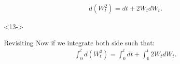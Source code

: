 \documentclass[10pt]{beamer}
\begin{document}
\begin{frame}[t]
\begin{onlyenv}
\begin{solution}
{\begin{align*}
        d(W_t^2) = dt + 2W_t dW_t.
      \end{align*}
      }
    \end{solution}
  \end{onlyenv}
  \begin{onlyenv}<13->
    \begin{block}{Revisiting}
      Now if we integrate both side such that:
      \begin{align*}
        \displaystyle\int_{0}^{t} d(W_t^2) = \displaystyle\int_{0}^{t}dt + \displaystyle\int_{0}^{t}2W_t dW_t. \\
      \end{align*}
    \end{block}
  \end{onlyenv}
\end{frame}
\end{document}
